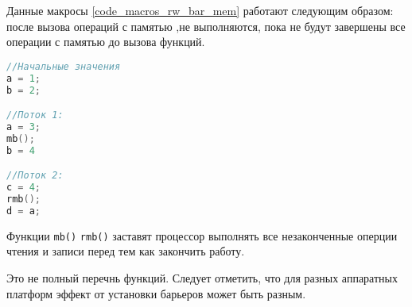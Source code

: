 Данные макросы \ref{code_macros_rw_bar_mem} работают следующим образом: после вызова операций с памятью ,не выполняются, пока не будут завершены все операции с памятью до вызова функций.

\begin{lstlisting}[language=c]
//Начальные значения
a = 1;
b = 2;

//Поток 1:
a = 3;
mb();
b = 4

//Поток 2:
с = 4;
rmb();
d = a;
\end{lstlisting}

Функции \verb|mb()| \verb|rmb()| заставят процессор выполнять все незаконченные оперции чтения и записи перед тем как закончить работу.

Это не полный перечнь функций. Следует отметить, что для разных аппаратных платформ эффект от установки барьеров может быть разным.
